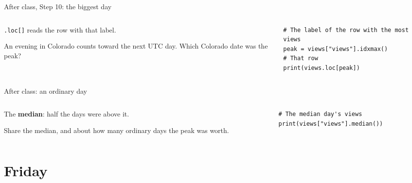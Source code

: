 \documentclass[9pt,aspectratio=169]{beamer}
\begin{document}
\begin{frame}[fragile]{After class, Step 10: the biggest day}
    \begin{columns}[T]
        \begin{column}{0.37\textwidth}
            \texttt{.loc[]} reads the row with that label.

            \medskip
            An evening in Colorado counts toward the next UTC day. Which Colorado date was the peak?
        \end{column}
        \begin{column}{0.6\textwidth}
\begin{lstlisting}
# The label of the row with the most views
peak = views["views"].idxmax()
# That row
print(views.loc[peak])
\end{lstlisting}
        \end{column}
    \end{columns}
\end{frame}

\begin{frame}[fragile]{After class: an ordinary day}
    \begin{columns}[T]
        \begin{column}{0.37\textwidth}
            The \textbf{median}: half the days were above it.

            \medskip
            Share the median, and about how many ordinary days the peak was worth.
        \end{column}
        \begin{column}{0.6\textwidth}
\begin{lstlisting}
# The median day's views
print(views["views"].median())
\end{lstlisting}
        \end{column}
    \end{columns}
\end{frame}


\section{Friday}

\end{document}
